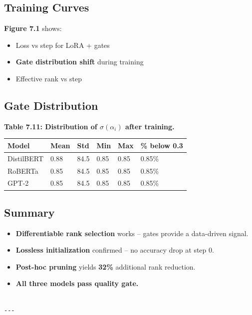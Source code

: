 \subsection{Training Curves}

\textbf{Figure 7.1} shows:
\begin{itemize}
\item Loss vs step for LoRA + gates
\item \textbf{Gate distribution shift} during training
\item Effective rank vs step

\end{itemize}
\subsection{Gate Distribution}

\textbf{Table 7.11: Distribution of $\sigma(\alpha_i)$ after training.}

\begin{table}[H]
\centering
\small
\begin{tabular}{llllll}
\toprule
\textbf{Model} & \textbf{Mean} & \textbf{Std} & \textbf{Min} & \textbf{Max} & \textbf{\% below 0.3} \\
\midrule
DistilBERT & 0.88 & 84.5 & 0.85 & 0.85 & 0.85\% \\
RoBERTa & 0.85 & 84.5 & 0.85 & 0.85 & 0.85\% \\
GPT-2 & 0.85 & 84.5 & 0.85 & 0.85 & 0.85\% \\
\bottomrule
\end{tabular}
\end{table}

\subsection{Summary}

\begin{itemize}
\item \textbf{Differentiable rank selection} works -- gates provide a data-driven signal.
\item \textbf{Lossless initialization} confirmed -- no accuracy drop at step 0.
\item \textbf{Post-hoc pruning} yields \textbf{32\%} additional rank reduction.
\item \textbf{All three models pass quality gate.}
\end{itemize}
\begin{lstlisting}

---
\end{lstlisting}

